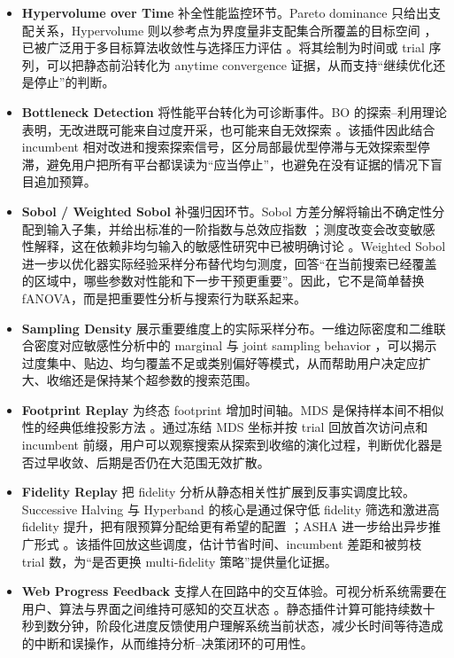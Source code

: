 \documentclass[11pt,a4paper]{ctexart}
\begin{document}
\begin{itemize}
    \item \textbf{Hypervolume over Time} 补全性能监控环节。Pareto dominance 只给出支配关系，Hypervolume 则以参考点为界度量非支配集合所覆盖的目标空间 \cite{zitzler1999spea}，已被广泛用于多目标算法收敛性与选择压力评估 \cite{while2006faster}。将其绘制为时间或 trial 序列，可以把静态前沿转化为 anytime convergence 证据，从而支持“继续优化还是停止”的判断。
    \item \textbf{Bottleneck Detection} 将性能平台转化为可诊断事件。BO 的探索--利用理论表明，无改进既可能来自过度开采，也可能来自无效探索 \cite{srinivas2010gaussian,shahriari2016taking}。该插件因此结合 incumbent 相对改进和搜索探索信号，区分局部最优型停滞与无效探索型停滞，避免用户把所有平台都误读为“应当停止”，也避免在没有证据的情况下盲目追加预算。
    \item \textbf{Sobol / Weighted Sobol} 补强归因环节。Sobol 方差分解将输出不确定性分配到输入子集，并给出标准的一阶指数与总效应指数 \cite{sobol2001global,saltelli2010variance}；测度改变会改变敏感性解释，这在依赖非均匀输入的敏感性研究中已被明确讨论 \cite{kucherenko2012dependent}。Weighted Sobol 进一步以优化器实际经验采样分布替代均匀测度，回答“在当前搜索已经覆盖的区域中，哪些参数对性能和下一步干预更重要”。因此，它不是简单替换 fANOVA，而是把重要性分析与搜索行为联系起来。
    \item \textbf{Sampling Density} 展示重要维度上的实际采样分布。一维边际密度和二维联合密度对应敏感性分析中的 marginal 与 joint sampling behavior \cite{saltelli2008global}，可以揭示过度集中、贴边、均匀覆盖不足或类别偏好等模式，从而帮助用户决定应扩大、收缩还是保持某个超参数的搜索范围。
    \item \textbf{Footprint Replay} 为终态 footprint 增加时间轴。MDS 是保持样本间不相似性的经典低维投影方法 \cite{kruskal1964mds}。通过冻结 MDS 坐标并按 trial 回放首次访问点和 incumbent 前缀，用户可以观察搜索从探索到收缩的演化过程，判断优化器是否过早收敛、后期是否仍在大范围无效扩散。
    \item \textbf{Fidelity Replay} 把 fidelity 分析从静态相关性扩展到反事实调度比较。Successive Halving 与 Hyperband 的核心是通过保守低 fidelity 筛选和激进高 fidelity 提升，把有限预算分配给更有希望的配置 \cite{jamieson2016nonstochastic,li2018hyperband}；ASHA 进一步给出异步推广形式 \cite{li2020asha}。该插件回放这些调度，估计节省时间、incumbent 差距和被剪枝 trial 数，为“是否更换 multi-fidelity 策略”提供量化证据。
    \item \textbf{Web Progress Feedback} 支撑人在回路中的交互体验。可视分析系统需要在用户、算法与界面之间维持可感知的交互状态 \cite{keim2008visual,endert2012human}。静态插件计算可能持续数十秒到数分钟，阶段化进度反馈使用户理解系统当前状态，减少长时间等待造成的中断和误操作，从而维持分析--决策闭环的可用性。
\end{itemize}
\end{document}
